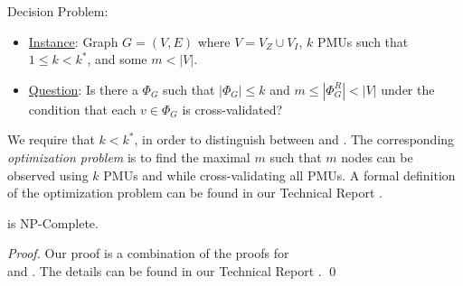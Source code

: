 \xvalpart Decision Problem:
\begin{itemize}
	\item \underline{Instance}: Graph $G=(V,E)$ where $V=V_Z \cup V_I$, $k$ PMUs such that $1 \leq k < k^*$, and some $m<|V|$.

	\item \underline{Question}: Is there a $\Phi_G$ such that $|\Phi_G| \leq k$ and $m \leq|\Phi^R_G| < |V|$ under the condition that each $v \in \Phi_G$ is cross-validated?
\end{itemize}

We require that $k<k^*$, in order to distinguish between \xval and \xvalparts.
The corresponding {\em optimization problem} is to find the maximal $m$ such that $m$ nodes can be observed using $k$ PMUs and while cross-validating all PMUs. A formal definition of the optimization problem can be found in our Technical Report \cite{Tech12}.


\begin{theorem}
\xvalpart is NP-Complete. %
\label{thm:npc-xvalpart}
\end{theorem}

\begin{proof}  Our proof is a combination of the proofs for \\
\maxinc and \xvals.
The details can be found in our Technical Report \cite{Tech12}. \qed
\end{proof}
